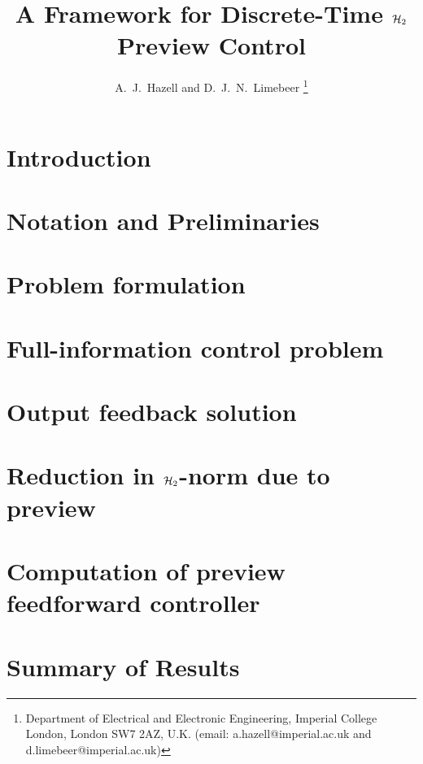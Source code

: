 \documentclass[a4paper,10pt]{article}
\title{\LARGE \bf A Framework for Discrete-Time $\mathcal H_2$ Preview Control}
\author{A.~J.~Hazell and D.~J.~N.~Limebeer%
\thanks{Department of Electrical and Electronic Engineering, Imperial College London, London SW7 2AZ, U.K. (email: a.hazell@imperial.ac.uk and d.limebeer@imperial.ac.uk)}%
}
\date{}
\theoremstyle{remark}
\begin{document}
\maketitle

\begin{abstract}

\end{abstract}


\begin{center}
\begin{minipage}{0.7\columnwidth}
\small

\normalsize 
\end{minipage}
\end{center}

\section{Introduction}

 
\section{Notation and Preliminaries}

 
\section{Problem formulation}

 
\section{Full-information control problem}


\section{Output feedback solution}

 
\section{Reduction in $\mathcal H_2$-norm due to preview}

 
\section{Computation of preview feedforward controller} 


\section{Summary of Results} 

 
\end{document}
